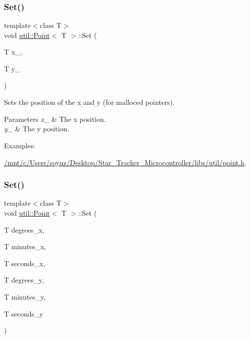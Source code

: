 \subsubsection{\texorpdfstring{Set()}{Set()}\hspace{0.1cm}{\footnotesize\ttfamily [1/2]}}
{\footnotesize\ttfamily template$<$class T$>$ \\
void \hyperlink{classutil_1_1Point}{util\+::\+Point}$<$ T $>$\+::Set (\begin{DoxyParamCaption}\item[{T}]{x\+\_\+,  }\item[{T}]{y\+\_\+ }\end{DoxyParamCaption})\hspace{0.3cm}{\ttfamily [inline]}}



Sets the position of the x and y (for malloced pointers). 


\begin{DoxyParams}{Parameters}
{\em x\+\_\+} & The x position. \\
\hline
{\em y\+\_\+} & The y position. \\
\hline
\end{DoxyParams}
\begin{Desc}
\item[Examples\+: ]\par
\hyperlink{_2mnt_2c_2Users_2soyuz_2Desktop_2Star_Tracker_Microcontroller_2libs_2util_2point_8h-example}{/mnt/c/\+Users/soyuz/\+Desktop/\+Star\+\_\+\+Tracker\+\_\+\+Microcontroller/libs/util/point.\+h}.\end{Desc}
\mbox{\label{classutil_1_1Point_adc1fb46aa99606d6eb31767ea6527432}} 
\subsubsection{\texorpdfstring{Set()}{Set()}\hspace{0.1cm}{\footnotesize\ttfamily [2/2]}}
{\footnotesize\ttfamily template$<$class T$>$ \\
void \hyperlink{classutil_1_1Point}{util\+::\+Point}$<$ T $>$\+::Set (\begin{DoxyParamCaption}\item[{T}]{degrees\+\_\+x,  }\item[{T}]{minutes\+\_\+x,  }\item[{T}]{seconds\+\_\+x,  }\item[{T}]{degrees\+\_\+y,  }\item[{T}]{minutes\+\_\+y,  }\item[{T}]{seconds\+\_\+y }\end{DoxyParamCaption})\hspace{0.3cm}{\ttfamily [inline]}}



